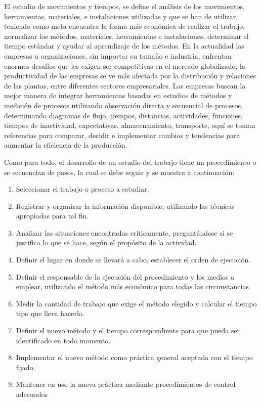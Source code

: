 El estudio de movimientos y tiempos, se define el análisis de los movimientos, herramientas, materiales, e instalaciones utilizadas y que se han de utilizar, teniendo como meta encuentra la forma más económica de realizar el trabajo, normalizar los métodos, materiales, herramientas e instalaciones, determinar el tiempo estándar y ayudar al aprendizaje de los métodos. En la actualidad las empresas u organizaciones, sin importar su tamaño e industria, enfrentan enormes desafíos que les exigen ser competitivas en el mercado globalizado, la productividad de las empresas se ve más afectada por la distribución y relaciones de las plantas, entre diferentes sectores empresariales. Las empresas buscan la mejor manera de integrar herramientas basadas en estudios de métodos y medición de procesos utilizando observación directa y secuencial de procesos, determinando diagramas de flujo, tiempos, distancias, actividades, funciones, tiempos de inactividad, expectativas, almacenamiento, transporte, aquí se toman referencias para comparar, decidir e implementar cambios y tendencias para aumentar la eficiencia de la producción.

Como para todo, el desarrollo de un estudio del trabajo tiene un procedimiento o se secuencian de pasos, la cual se debe seguir y se muestra a continuación: 


 \begin{enumerate}
     \item Seleccionar el trabajo o proceso a estudiar. 
     \item Registrar  y  organizar  la  información  disponible,  utilizando  las técnicas apropiadas para tal fin. 
     \item Analizar las situaciones encontradas críticamente,  preguntándose si se justifica lo que se hace, según el propósito de la actividad. 
     \item Definir el  lugar en donde  se llevará a  cabo, establecer el  orden de ejecución. 
     \item Definir el responsable de la ejecución del procedimiento y los medios a  emplear,  utilizando  el  método  más  económico  para  todas  las circunstancias.
     \item Medir la cantidad de trabajo que exige el método elegido y calcular el tiempo tipo que lleva hacerlo.
     \item Definir el nuevo método y el tiempo correspondiente para que pueda ser identificado en todo momento. 
     \item Implementar el nuevo método  como práctica general aceptada  con el tiempo fijado. 
     \item Mantener  en  uso  la  nueva  práctica mediante  procedimientos  de control adecuados \cite{niebel1980ingenieria}
 \end{enumerate}


